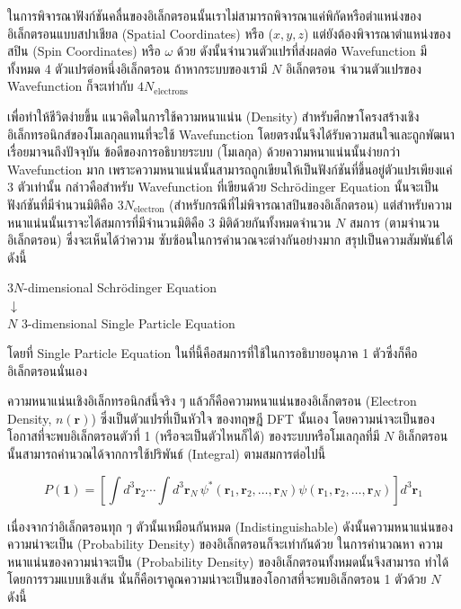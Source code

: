 ในการพิจารณาฟังก์ชันคลื่นของอิเล็กตรอนนั้นเราไม่สามารถพิจารณาแค่พิกัดหรือตำแหน่งของอิเล็กตรอนแบบสปาเชียล (Spatial Coordinates) หรือ
($x, y, z$) แต่ยังต้องพิจารณาตำแหน่งของสปิน (Spin Coordinates) หรือ $\omega$ ด้วย ดังนั้นจำนวนตัวแปรที่ส่งผลต่อ Wavefunction 
มีทั้งหมด 4 ตัวแปรต่อหนึ่งอิเล็กตรอน ถ้าหากระบบของเรามี $N$ อิเล็กตรอน จำนวนตัวแปรของ Wavefunction ก็จะเท่ากับ 
$4 N_{\text{electrons}}$

เพื่อทำให้ชีวิตง่ายขึ้น แนวคิดในการใช้ความหนาแน่น (Density) สำหรับศึกษาโครงสร้างเชิงอิเล็กทรอนิกส์ของโมเลกุลแทนที่จะใช้ Wavefunction 
โดยตรงนั้นจึงได้รับความสนใจและถูกพัฒนาเรื่อยมาจนถึงปัจจุบัน ข้อดีของการอธิบายระบบ (โมเลกุล) ด้วยความหนาแน่นนั้นง่ายกว่า Wavefunction 
มาก เพราะความหนาแน่นนั้นสามารถถูกเขียนให้เป็นฟังก์ชันที่ขึ้นอยู่ตัวแปรเพียงแค่ 3 ตัวเท่านั้น กล่าวคือสำหรับ Wavefunction ที่เขียนด้วย 
Schr\"{o}dinger Equation นั้นจะเป็นฟังก์ชันที่มีจำนวนมิติคือ $3N_{\text{electron}}$ (สำหรับกรณีที่ไม่พิจารณาสปินของอิเล็กตรอน) 
แต่สำหรับความหนาแน่นนั้นเราจะได้สมการที่มีจำนวนมิติคือ 3 มิติด้วยกันทั้งหมดจำนวน $N$ สมการ (ตามจำนวนอิเล็กตรอน) ซึ่งจะเห็นได้ว่าความ%
ซับซ้อนในการคำนวณจะต่างกันอย่างมาก สรุปเป็นความสัมพันธ์ได้ดังนี้

\begin{framed}
    \centering
    $3N$-dimensional Schr\"{o}dinger Equation\\ $\downarrow$\\ $N$ $3$-dimensional Single Particle Equation
\end{framed}

\noindent โดยที่ Single Particle Equation ในที่นี้คือสมการที่ใช้ในการอธิบายอนุภาค 1 ตัวซึ่งก็คืออิเล็กตรอนนั่นเอง

ความหนาแน่นเชิงอิเล็กทรอนิกส์นี้จริง ๆ แล้วก็คือความหนาแน่นของอิเล็กตรอน (Electron Density, $n(\bm{r})$) ซึ่งเป็นตัวแปรที่เป็นหัวใจ%
ของทฤษฎี DFT นั้นเอง โดยความน่าจะเป็นของโอกาสที่จะพบอิเล็กตรอนตัวที่ 1 (หรือจะเป็นตัวไหนก็ได้) ของระบบหรือโมเลกุลที่มี $N$ อิเล็กตรอน%
นั้นสามารถคำนวณได้จากการใช้ปริพันธ์ (Integral) ตามสมการต่อไปนี้

\begin{equation}\label{eq:elec_prob_density_1e}
    P(\bm{1}) = \left [ \int {d}^{3} \bm{r}_{2} \cdots \int {d}^{3} \bm{r}_{N} \, 
                \psi^*(\bm{r}_{1}, \bm{r}_{2}, \dots, \bm{r}_{N}) \psi(\bm{r}_{1}, \bm{r}_2, 
                \dots, \bm{r}_N) \right ] {d}^{3} \bm{r}_{1}
\end{equation}

เนื่องจากว่าอิเล็กตรอนทุก ๆ ตัวนั้นเหมือนกันหมด (Indistinguishable) ดังนั้นความหนาแน่นของความน่าจะเป็น (Probability Density) 
ของอิเล็กตรอนก็จะเท่ากันด้วย ในการคำนวณหา ความหนาแน่นของความน่าจะเป็น (Probability Density) ของอิเล็กตรอนทั้งหมดนั้นจึงสามารถ%
ทำได้โดยการรวมแบบเชิงเส้น นั่นก็คือเราคูณความน่าจะเป็นของโอกาสที่จะพบอิเล็กตรอน 1 ตัวด้วย $N$ ดังนี้

